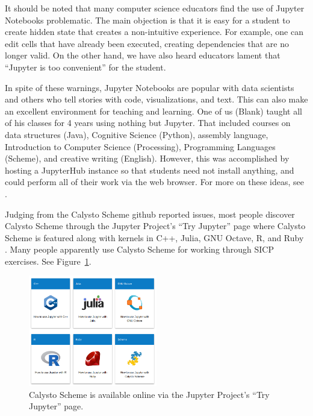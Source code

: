 \documentclass[acmsmall,screen,authorversion]{acmart}
\begin{document}
It should be noted that many computer science educators find the use
of Jupyter Notebooks problematic. The main objection is that it is
easy for a student to create hidden state that creates a non-intuitive
experience. For example, one can edit cells that have already been
executed, creating dependencies that are no longer valid. On the other
hand, we have also heard educators lament that ``Jupyter is too
convenient'' for the student.

In spite of these warnings, Jupyter Notebooks are popular with data
scientists and others who tell stories with code, visualizations, and
text. This can also make an excellent environment for teaching and
learning. One of us (Blank) taught all of his classes for 4 years
using nothing but Jupyter. That included courses on data structures
(Java), Cognitive Science (Python), assembly language, Introduction to
Computer Science (Processing), Programming Languages (Scheme), and
creative writing (English). However, this was accomplished by hosting
a JupyterHub instance so that students need not install anything, and
could perform all of their work via the web browser. For more on these
ideas, see \cite{Calico2}.

Judging from the Calysto Scheme github reported issues, most people discover
Calysto Scheme through the Jupyter Project's ``Try Jupyter'' page where Calysto
Scheme is featured along with kernels in C++, Julia, GNU Octave, R, and Ruby
\cite{TryJupyter}. Many people apparently use Calysto Scheme for working
through SICP exercises. See Figure~\ref{fig:try-jupyter}.

\begin{figure}[h]
  \centering
  \includegraphics[width=0.5\textwidth]{try-jupyter.png}
  \caption{Calysto Scheme is available online via the Jupyter Project's ``Try Jupyter'' page.}
  \label{fig:try-jupyter}
\end{figure}


\end{document}

